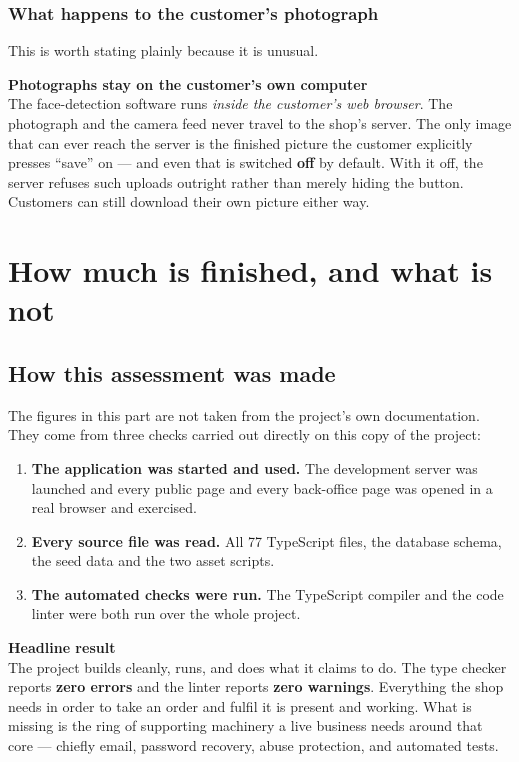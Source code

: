 \documentclass[11pt,a4paper]{report}
\newcommand{\keybox}[2]{%
  \begin{center}
  \begin{minipage}{0.94\textwidth}
  \colorbox{vclight}{\parbox{\dimexpr\textwidth-2\fboxsep}{%
    \vspace{3pt}\textbf{\color{vcblue}#1}\\[3pt]#2\vspace{4pt}}}
  \end{minipage}
  \end{center}}
\begin{document}
\section{What happens to the customer's photograph}

This is worth stating plainly because it is unusual.

\keybox{Photographs stay on the customer's own computer}{The face-detection
software runs \emph{inside the customer's web browser}. The photograph and the
camera feed never travel to the shop's server. The only image that can ever
reach the server is the finished picture the customer explicitly presses
``save'' on --- and even that is switched \textbf{off} by default. With it off,
the server refuses such uploads outright rather than merely hiding the button.
Customers can still download their own picture either way.}

\part{How much is finished, and what is not}

\chapter{How this assessment was made}

The figures in this part are not taken from the project's own documentation.
They come from three checks carried out directly on this copy of the project:

\begin{enumerate}
  \item \textbf{The application was started and used.} The development server
        was launched and every public page and every back-office page was
        opened in a real browser and exercised.
  \item \textbf{Every source file was read.} All 77 TypeScript files, the
        database schema, the seed data and the two asset scripts.
  \item \textbf{The automated checks were run.} The TypeScript compiler and
        the code linter were both run over the whole project.
\end{enumerate}

\keybox{Headline result}{The project builds cleanly, runs, and does what it
claims to do. The type checker reports \textbf{zero errors} and the linter
reports \textbf{zero warnings}. Everything the shop needs in order to take an
order and fulfil it is present and working. What is missing is the ring of
supporting machinery a live business needs around that core --- chiefly email,
password recovery, abuse protection, and automated tests.}
\end{document}
